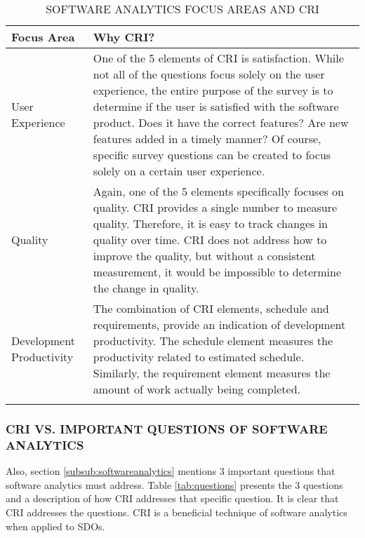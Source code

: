 \documentclass[SDSUThesis.tex]{subfiles}
\begin{document}
            \begin{longtable}{p{3cm}p{11cm}}
                \toprule%
                 \centering%
                 {\bfseries Focus Area}
                 & {\bfseries Why CRI?} \\
                
                \cmidrule[0.4pt](r{0.125em}){1-1}%
                \cmidrule[0.4pt](lr{0.125em}){2-2}%
                \endhead
                
                User Experience & One of the 5 elements of CRI is satisfaction.  While not all of the questions focus solely on the user experience, the entire purpose of the survey is to determine if the user is satisfied
                with the software product. Does it have the correct features? Are new features added in a timely manner? Of course, specific survey questions can be created to focus solely on a certain user experience. \\
                \myrowcolour%
                Quality & Again, one of the 5 elements specifically focuses on quality.  CRI provides a single number
                to measure quality.  Therefore, it is easy to track changes in quality over time.  CRI does not address
                how to improve the quality, but without a consistent measurement, it would be impossible to determine the change in quality. \\
                Development Productivity & The combination of CRI elements, schedule and requirements, provide an 
                indication of development productivity. The schedule element measures the productivity
                related to estimated schedule. Similarly, the requirement element measures the amount of
                work actually being completed.  \\
                
                \bottomrule
                
                \caption{SOFTWARE ANALYTICS FOCUS AREAS AND CRI}
                \label{tab:focusareas}
            \end{longtable}
        
        
        \subsubsection{CRI VS. IMPORTANT QUESTIONS OF SOFTWARE ANALYTICS}
            Also, section \ref{subsub:softwareanalytics} mentions 3 important questions that
            software analytics must address.  Table \ref{tab:questions} presents the 3 questions
            and a description of how CRI addresses that specific question.  It is clear
            that CRI addresses the questions.  CRI is a beneficial technique of software
            analytics when applied to SDOs.
        
\end{document}

